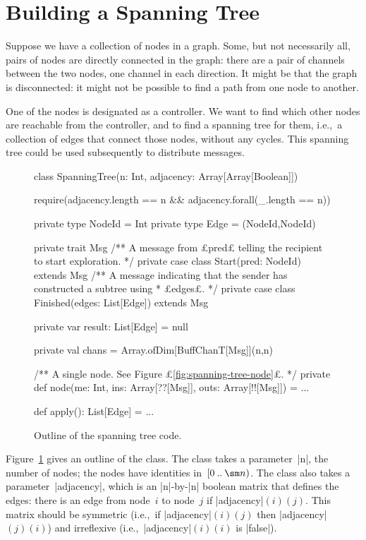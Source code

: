 \section{Building a Spanning Tree}

Suppose we have a collection of nodes in a graph.  Some, but not necessarily
all, pairs of nodes are directly connected in the graph: there are a pair of
channels between the two nodes, one channel in each direction.  It might be
that the graph is disconnected: it might not be possible to find a path from
one node to another.

One of the nodes is designated as a controller.  We want to find which other
nodes are reachable from the controller, and to find a spanning
tree for them, i.e.,~a collection of edges that connect
those nodes, without any cycles.  This spanning tree could be used
subsequently to distribute messages.


\begin{figure}[tbh]
\begin{scala}
class SpanningTree(n: Int, adjacency: Array[Array[Boolean]]){
  require(adjacency.length == n && adjacency.forall(_.length == n))

  private type NodeId = Int
  private type Edge = (NodeId,NodeId)

  private trait Msg
  /** A message from £pred£ telling the recipient to start exploration. */
  private case class Start(pred: NodeId) extends Msg
  /** A message indicating that the sender has constructed a subtree using
    * £edges£. */
  private case class Finished(edges: List[Edge]) extends Msg

  private var result: List[Edge] = null

  private val chans = Array.ofDim[BuffChanT[Msg]](n,n)

  /** A single node.  See Figure £\ref{fig:spanning-tree-node}£. */
  private def node(me: Int, ins: Array[??[Msg]], outs: Array[!![Msg]]) = ...

  def apply(): List[Edge] = ...
}
\end{scala}
\caption{Outline of the spanning tree code.}
\label{fig:spanning-tree}
\end{figure}


Figure~\ref{fig:spanning-tree} gives an outline of the class.  The class takes
a parameter~|n|, the number of nodes; the nodes have identities
in~$\interval{0}{\sm n}$.  The class also takes a parameter~|adjacency|, which
is an |n|-by-|n| boolean matrix that defines the edges: there is an edge from
node~$i$ to node~$j$ if |adjacency|$(i)(j)$.  This matrix should be symmetric
(i.e.,~if |adjacency|$(i)(j)$ then |adjacency|$(j)(i)$) and irreflexive
(i.e.,~|adjacency|$(i)(i)$ is |false|).

